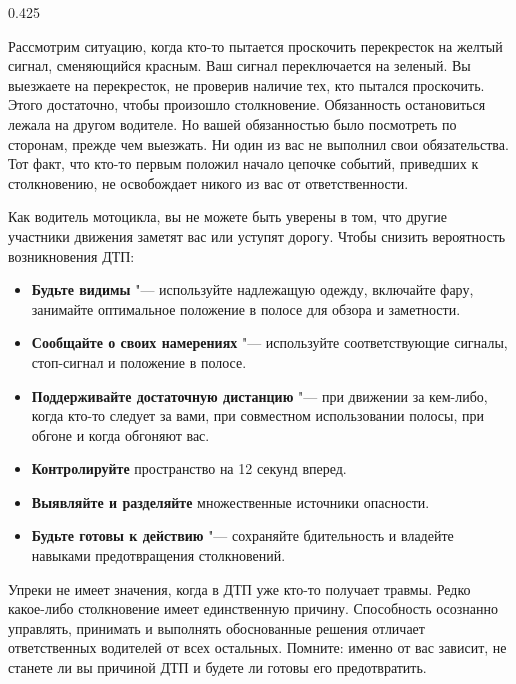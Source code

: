 \begin{langblock}{0.425}
\begin{rus}
		Рассмотрим ситуацию, когда кто-то пытается проскочить перекресток на желтый сигнал, сменяющийся красным. Ваш сигнал переключается на зеленый. Вы выезжаете на перекресток, не проверив наличие тех, кто пытался проскочить. Этого достаточно, чтобы произошло столкновение. Обязанность остановиться лежала на другом водителе. Но вашей обязанностью было посмотреть по сторонам, прежде чем выезжать. Ни один из вас не выполнил свои обязательства. Тот факт, что кто-то первым положил начало цепочке событий, приведших к столкновению, не освобождает никого из вас от ответственности.
		
		Как водитель мотоцикла, вы не можете быть уверены в том, что другие участники движения заметят вас или уступят дорогу. Чтобы снизить вероятность возникновения ДТП:
		\begin{itemize}
			\item \textbf{Будьте видимы} "--- используйте надлежащую одежду, включайте фару, занимайте оптимальное положение в полосе для обзора и заметности.
			\item \textbf{Сообщайте о своих намерениях} "--- используйте соответствующие сигналы, стоп-сигнал и положение в полосе.
			\item \textbf{Поддерживайте достаточную дистанцию} "--- при движении за кем-либо, когда кто-то следует за вами, при совместном использовании полосы, при обгоне и когда обгоняют вас.
			\item \textbf{Контролируйте} пространство на 12 секунд вперед.
			\item \textbf{Выявляйте и разделяйте} множественные источники опасности.
			\item \textbf{Будьте готовы к действию} "--- сохраняйте бдительность и владейте навыками предотвращения столкновений.
		\end{itemize}
		Упреки не имеет значения, когда в ДТП уже кто-то получает травмы. Редко какое-либо столкновение имеет единственную причину. Способность осознанно управлять, принимать и выполнять обоснованные решения отличает ответственных водителей от всех остальных. Помните: именно от вас зависит, не станете ли вы причиной ДТП и будете ли готовы его предотвратить.
\end{rus}
\end{langblock}
